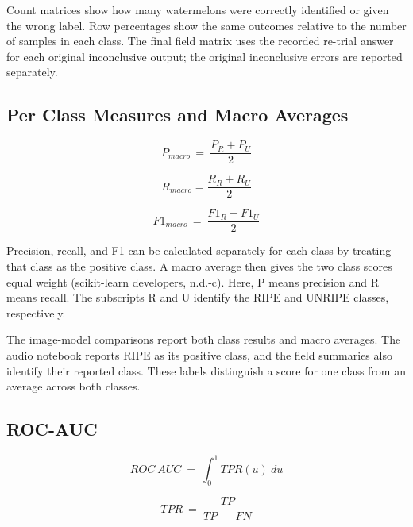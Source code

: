 \begin{thesisprose}
Count matrices show how many watermelons were correctly identified or given the wrong label. Row percentages show the same outcomes relative to the number of samples in each class. The final field matrix uses the recorded re-trial answer for each original inconclusive output; the original inconclusive errors are reported separately.

\subsection{Per Class Measures and Macro Averages}

\begin{equation}
  P_{macro\ } = \ \frac{P_{R} + P_{U}}{2}
  \label{eq:formula-621}
\end{equation}

\begin{equation}
  R_{macro} = \frac{R_{R} + R_{U}}{2}
  \label{eq:formula-622}
\end{equation}

\begin{equation}
  {F1}_{macro\ } = \ \frac{{F1}_{R} + {F1}_{U}}{2}
  \label{eq:formula-623}
\end{equation}

Precision, recall, and F1 can be calculated separately for each class by treating that class as the positive class. A macro average then gives the two class scores equal weight (scikit-learn developers, n.d.-c). Here, P means precision and R means recall. The subscripts R and U identify the RIPE and UNRIPE classes, respectively.

The image-model comparisons report both class results and macro averages. The audio notebook reports RIPE as its positive class, and the field summaries also identify their reported class. These labels distinguish a score for one class from an average across both classes.

\subsection{ROC-AUC}

\begin{equation}
  ROC\ AUC\  = \ \int_{0}^{1}{}TPR(u)\ du
  \label{eq:formula-627}
\end{equation}

\begin{equation}
  TPR\  = \ \frac{TP}{TP\  + \ FN}
  \label{eq:formula-628}
\end{equation}


\end{thesisprose}
